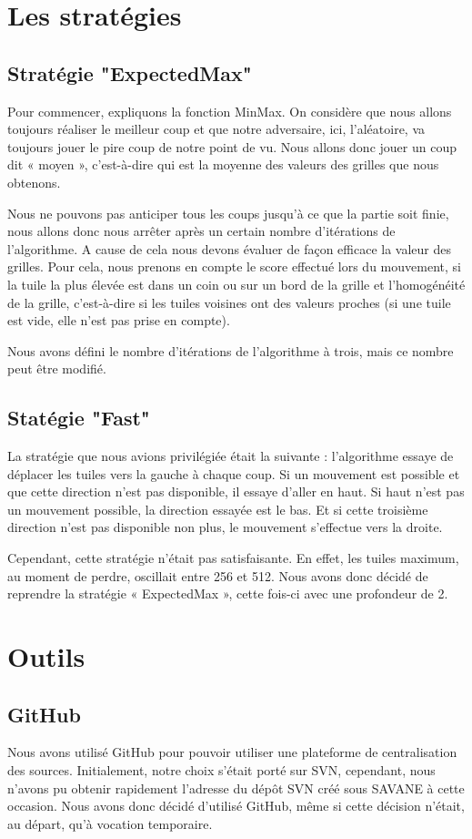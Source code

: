 \documentclass[12pt]{report}
\begin{document}
\chapter{Les stratégies}
\section{Stratégie "ExpectedMax"}
 Pour commencer, expliquons la fonction MinMax. On considère que nous allons toujours réaliser le meilleur coup et que notre adversaire, ici, l’aléatoire, va toujours jouer le pire coup de notre point de vu. Nous allons donc jouer un coup dit « moyen », c’est-à-dire qui est la moyenne des valeurs des grilles que nous obtenons.

Nous ne pouvons pas anticiper tous les coups jusqu’à ce que la partie soit finie, nous allons donc nous arrêter après un certain nombre d’itérations de l’algorithme. A cause de cela nous devons évaluer de façon efficace la valeur des grilles. Pour cela, nous prenons en compte le score effectué lors du mouvement, si la tuile la plus élevée est dans un coin ou sur un bord de la grille et l’homogénéité de la grille, c’est-à-dire si les tuiles voisines ont des valeurs proches (si une tuile est vide, elle n’est pas prise en compte).

Nous avons défini le nombre d’itérations de l’algorithme à trois, mais ce nombre peut être modifié.
\section{Statégie "Fast"}

La stratégie que nous avions privilégiée était la suivante : l’algorithme essaye de déplacer les tuiles vers la gauche à chaque coup. Si un mouvement est possible et que cette direction n’est pas disponible, il essaye d’aller en haut. Si haut n’est pas un mouvement possible, la direction essayée est le bas. Et si cette troisième direction n’est pas disponible non plus, le mouvement s’effectue vers la droite. 

Cependant, cette stratégie n’était pas satisfaisante. En effet, les tuiles maximum, au moment de perdre, oscillait entre 256 et 512. Nous avons donc décidé de reprendre la stratégie « ExpectedMax », cette fois-ci avec une profondeur de 2.

\chapter{Outils}
\section{GitHub}
Nous avons utilisé GitHub pour pouvoir utiliser une plateforme de centralisation des sources. Initialement, notre choix s’était porté sur SVN, cependant, nous n’avons pu obtenir rapidement l’adresse du dépôt SVN créé sous SAVANE à cette occasion.  Nous avons donc décidé d’utilisé GitHub, même si cette décision n’était, au départ, qu’à vocation temporaire.
\end{document}
